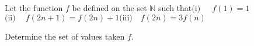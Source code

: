 Let the function $f$ be defined on the set $\mathbb{N}$ such that$\text{(i)}\ \ \quad f(1)=1$$\text{(ii)}\ \quad f(2n+1)=f(2n)+1$$\text{(iii)}\quad f(2n)=3f(n)$

Determine the set of values taken $f$.